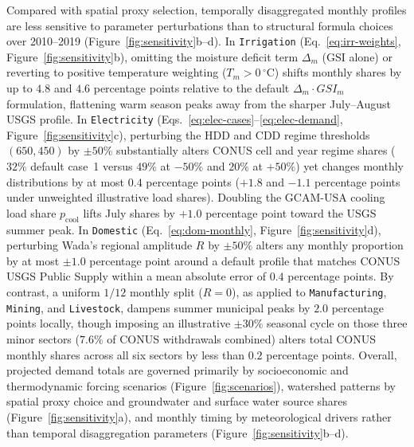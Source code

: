 \documentclass[fleqn,10pt]{wlscirep}
\begin{document}
Compared with spatial proxy selection, temporally disaggregated monthly profiles are less sensitive to parameter perturbations than to structural formula choices over 2010--2019 (Figure~\ref{fig:sensitivity}b--d). In \texttt{Irrigation} (Eq.~\ref{eq:irr-weights}, Figure~\ref{fig:sensitivity}b), omitting the moisture deficit term $\Delta_m$ (GSI alone) or reverting to positive temperature weighting ($T_m > 0\,^{\circ}\mathrm{C}$) shifts monthly shares by up to $4.8$ and $4.6$ percentage points relative to the default $\Delta_m \cdot GSI_m$ formulation, flattening warm season peaks away from the sharper July--August USGS profile. In \texttt{Electricity} (Eqs.~\ref{eq:elec-cases}--\ref{eq:elec-demand}, Figure~\ref{fig:sensitivity}c), perturbing the HDD and CDD regime thresholds $(650, 450)$\cite{Huang2018} by $\pm 50\%$ substantially alters CONUS cell and year regime shares ($32\%$ default case~1 versus $49\%$ at $-50\%$ and $20\%$ at $+50\%$) yet changes monthly distributions by at most $0.4$ percentage points ($+1.8$ and $-1.1$ percentage points under unweighted illustrative load shares). Doubling the GCAM-USA cooling load share $p_{\mathrm{cool}}$ lifts July shares by $+1.0$ percentage point toward the USGS summer peak. In \texttt{Domestic} (Eq.~\ref{eq:dom-monthly}, Figure~\ref{fig:sensitivity}d), perturbing Wada's regional amplitude $R$\cite{Wada2011} by $\pm 50\%$ alters any monthly proportion by at most $\pm 1.0$ percentage point around a default profile that matches CONUS USGS Public Supply within a mean absolute error of $0.4$ percentage points. By contrast, a uniform $1/12$ monthly split ($R=0$), as applied to \texttt{Manufacturing}, \texttt{Mining}, and \texttt{Livestock}, dampens summer municipal peaks by $2.0$ percentage points locally, though imposing an illustrative $\pm 30\%$ seasonal cycle on those three minor sectors ($7.6\%$ of CONUS withdrawals combined) alters total CONUS monthly shares across all six sectors by less than $0.2$ percentage points. Overall, projected demand totals are governed primarily by socioeconomic and thermodynamic forcing scenarios (Figure~\ref{fig:scenarios}), watershed patterns by spatial proxy choice and groundwater and surface water source shares (Figure~\ref{fig:sensitivity}a), and monthly timing by meteorological drivers rather than temporal disaggregation parameters (Figure~\ref{fig:sensitivity}b--d).
\end{document}
